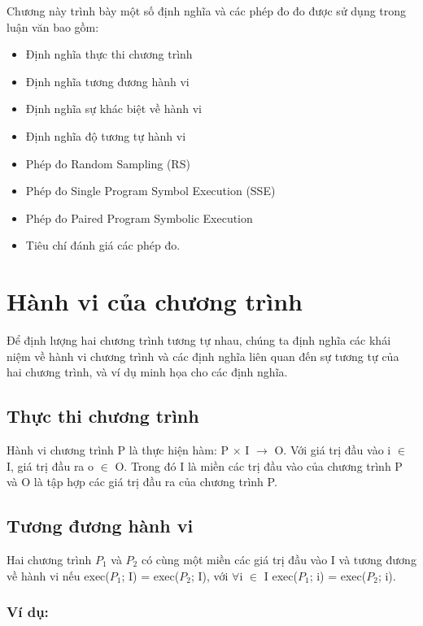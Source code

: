 Chương này trình bày một số định nghĩa và các phép đo đo được sử dụng trong luận văn bao gồm:
\begin{itemize}	
	\item Định nghĩa thực thi chương trình
	\item Định nghĩa tương đương hành vi
	\item Định nghĩa sự khác biệt về hành vi
	\item Định nghĩa độ tương tự hành vi
	\item Phép đo Random Sampling (RS)
	\item Phép đo Single Program Symbol Execution (SSE)
	\item Phép đo Paired Program Symbolic Execution
	\item Tiêu chí đánh giá các phép đo.
\end{itemize}

\section{Hành vi của chương trình}
Để định lượng hai chương trình tương tự nhau, chúng ta định nghĩa các khái niệm về hành vi chương trình và các định nghĩa liên quan đến sự tương tự của hai chương trình, và ví dụ minh họa cho các định nghĩa. 
	
\subsection{Thực thi chương trình}
\begin{definition}\label{def:progexe}
Hành vi chương trình P là thực hiện hàm: P $\times$ I $\rightarrow$ O. Với giá trị đầu vào i $\in$ I, giá trị đầu ra o $\in$ O. Trong đó I là miền các trị đầu vào của chương trình P và O là tập hợp các giá trị đầu ra của chương trình P.  
\end{definition}

\subsection{Tương đương hành vi}
\begin{definition}
  Hai chương trình $P_{1}$ và $P_{2}$ có cùng một miền các giá trị đầu
  vào I và tương đương về hành vi nếu exec($P_{1}$; I) = exec($P_{2}$;
  I), với $\forall$i $\in$ I exec($P_{1}$; i) = exec($P_{2}$; i).
\end{definition}
	
\subsubsection{Ví dụ:}

